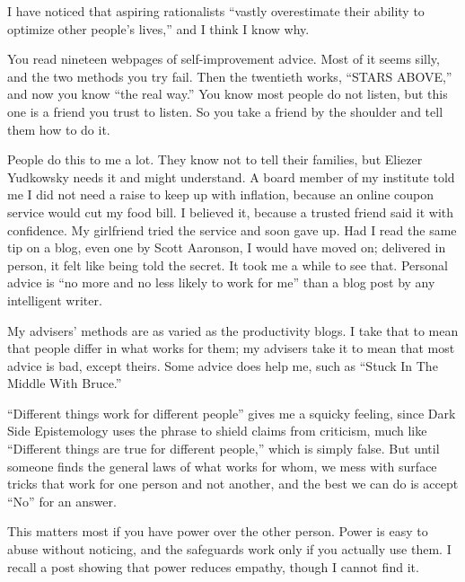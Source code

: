 
I have noticed that aspiring rationalists ``vastly overestimate their ability to optimize other people's lives,'' and I think I know why.

You read nineteen webpages of self-improvement advice. Most of it seems silly, and the two methods you try fail. Then the twentieth works, ``STARS ABOVE,'' and now you know ``the real way.'' You know most people do not listen, but this one is a friend you trust to listen. So you take a friend by the shoulder and tell them how to do it.

People do this to me a lot. They know not to tell their families, but Eliezer Yudkowsky needs it and might understand. A board member of my institute told me I did not need a raise to keep up with inflation, because an online coupon service would cut my food bill. I believed it, because a trusted friend said it with confidence. My girlfriend tried the service and soon gave up.  Had I read the same tip on a blog, even one by Scott Aaronson, I would have moved on; delivered in person, it felt like being told the secret. It took me a while to see that. Personal advice is ``no more and no less likely to work for me'' than a blog post by any intelligent writer.

My advisers' methods are as varied as the productivity blogs. I take that to mean that people differ in what works for them; my advisers take it to mean that most advice is bad, except theirs. Some advice does help me, such as ``Stuck In The Middle With Bruce.'' 

``Different things work for different people'' gives me a squicky feeling, since Dark Side Epistemology uses the phrase to shield claims from criticism, much like ``Different things are true for different people,'' which is simply false. But until someone finds the general laws of what works for whom, we mess with surface tricks that work for one person and not another, and the best we can do is accept ``No'' for an answer.

This matters most if you have power over the other person. Power is easy to abuse without noticing, and the safeguards work only if you actually use them. I recall a post showing that power reduces empathy, though I cannot find it. 

